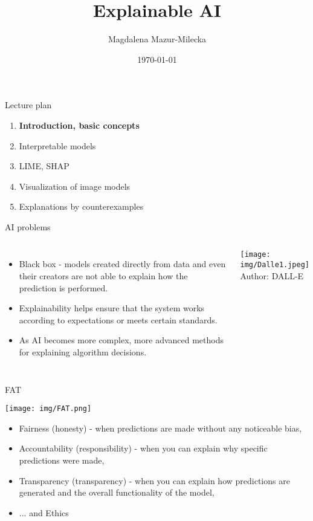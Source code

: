\documentclass{beamer}
\title[Explainable AI]{Explainable AI}
\author{Magdalena Mazur-Milecka}
\date{\today}
\begin{document}
\pgtitleframe




\begin{frame}{Lecture plan}
\begin{enumerate}
\item \textbf{Introduction, basic concepts}
\item Interpretable models
\item LIME, SHAP
\item Visualization of image models
\item Explanations by counterexamples
\end{enumerate}
\end{frame}



\begin{frame}{AI problems}
\begin{columns}
\begin{itemize}
\item Black box - models created directly from data and even their creators are not able to explain how the prediction is performed.
\item Explainability helps ensure that the system works according to expectations or meets certain standards.
\item As AI becomes more complex, more advanced methods for explaining algorithm decisions.
\end{itemize}
\texttt{[image: img/Dalle1.jpeg]} \\
Author: DALL-E
\end{columns}
\end{frame}

\begin{frame}{FAT}
\begin{center}
\texttt{[image: img/FAT.png]} 
\end{center}
\begin{itemize}
\item Fairness (honesty) - when predictions are made without any noticeable bias,
\item Accountability (responsibility) - when you can explain why specific predictions were made,
\item Transparency (transparency) - when you can explain how predictions are generated and the overall functionality of the model,
\item ... and Ethics
\end{itemize}
\end{frame}
\end{document}
